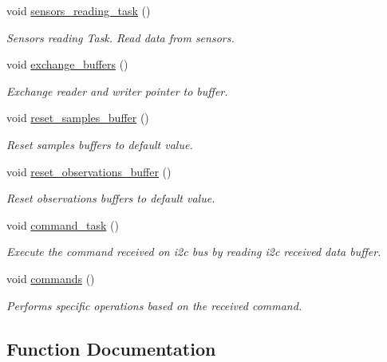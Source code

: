 \begin{DoxyCompactItemize}
void \hyperlink{i2c-th_8ino_ad3efe51e17cb8205a24267c2992a12d4}{sensors\+\_\+reading\+\_\+task} ()
\begin{DoxyCompactList}\small\item\em Sensors reading Task. Read data from sensors. \end{DoxyCompactList}\item 
void \hyperlink{i2c-th_8ino_a46696a96b3118b5d8900703c054166c8}{exchange\+\_\+buffers} ()
\begin{DoxyCompactList}\small\item\em Exchange reader and writer pointer to buffer. \end{DoxyCompactList}\item 
void \hyperlink{i2c-th_8ino_ae176339df7451dc03037f319710575aa}{reset\+\_\+samples\+\_\+buffer} ()
\begin{DoxyCompactList}\small\item\em Reset samples buffers to default value. \end{DoxyCompactList}\item 
void \hyperlink{i2c-th_8ino_adfc6b4ac31f79cb1c99dd2409f05f32d}{reset\+\_\+observations\+\_\+buffer} ()
\begin{DoxyCompactList}\small\item\em Reset observations buffers to default value. \end{DoxyCompactList}\item 
void \hyperlink{i2c-th_8ino_a42389aceb96a84573eb67e6d141cb594}{command\+\_\+task} ()
\begin{DoxyCompactList}\small\item\em Execute the command received on i2c bus by reading i2c received data buffer. \end{DoxyCompactList}\item 
void \hyperlink{i2c-th_8ino_a4981066e183f1432ffd6eddf55826585}{commands} ()
\begin{DoxyCompactList}\small\item\em Performs specific operations based on the received command. \end{DoxyCompactList}\end{DoxyCompactItemize}


\subsection{Function Documentation}
\mbox{\label{i2c-th_8ino_a42389aceb96a84573eb67e6d141cb594}} 
